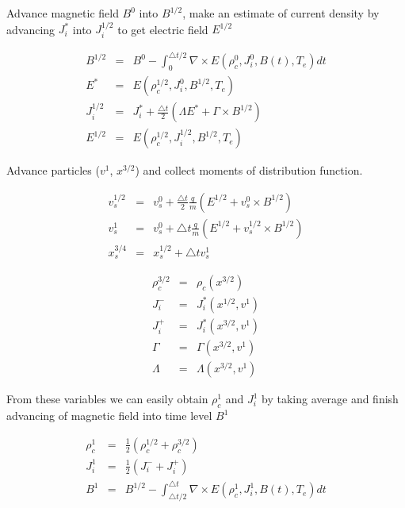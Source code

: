 \documentclass[oneside,branding,toc,article]{satdoc}
\begin{document}
Advance magnetic field $B^0$ into $B^{1/2}$, make an estimate of current
density by advancing $J_i^*$ into $J_i^{1/2}$ to get electric field $E^{1/2}$

\begin{eqnarray}
  \label{eq:step1}
  B^{1/2} & = & B^0 - \int_0^{\triangle t/2} \nabla \times E(\rho_c^0, J_i^0,
  B(t), T_e) dt \nonumber \\
  E^* & = & E(\rho_c^{1/2}, J_i^0, B^{1/2}, T_e) \nonumber \\
  J_i^{1/2} & = & J_i^* + \frac{\triangle t}{2}(\Lambda E^* + \Gamma
  \times B^{1/2}) \nonumber \\
  E^{1/2} & = & E(\rho_c^{1/2}, J_i^{1/2}, B^{1/2}, T_e) \nonumber
\end{eqnarray}

Advance particles ($v^1$, $x^{3/2}$) and collect moments of distribution
function.

\begin{eqnarray}
  \label{eq:step2a}
  v_s^{1/2} & = & v_s^{0} + \frac{\triangle t}{2} \frac{q}{m}
  (E^{1/2} + v_s^{0} \times B^{1/2}) \nonumber \\
  v_s^{1} & = & v_s^{0} + \triangle t \frac{q}{m}(E^{1/2} + v_s^{1/2} \times
  B^{1/2}) \nonumber \\
  x_s^{3/4} & = & x_s^{1/2} + \triangle t v_s^{1} \nonumber
\end{eqnarray}

\begin{eqnarray}
  \label{eq:step2b}
  \rho_c^{3/2} & = & \rho_c (x^{3/2}) \nonumber \\
  J_i^- & = & J_i^* (x^{1/2}, v^1) \nonumber \\
  J_i^+ & = & J_i^* (x^{3/2}, v^1) \nonumber \\
  \Gamma & = & \Gamma (x^{3/2}, v^1) \nonumber \\
  \Lambda & = & \Lambda (x^{3/2}, v^1) \nonumber
\end{eqnarray}

From these variables we can easily obtain $\rho_c^{1}$ and $J_i^{1}$ by taking
average and finish advancing of magnetic field into time level $B^1$

\begin{eqnarray}
  \label{eq:step2b}
  \rho_c^{1} & = & \frac{1}{2} (\rho_c^{1/2} + \rho_c^{3/2}) \nonumber \\
  J_i^{1} & = & \frac{1}{2} (J_i^- + J_i^+) \nonumber \\
  B^{1} & = & B^{1/2} - \int_{\triangle t/2}^{\triangle t} \nabla \times
  E(\rho_c^{1}, J_i^1, B(t), T_e) dt \nonumber
\end{eqnarray}
\end{document}
